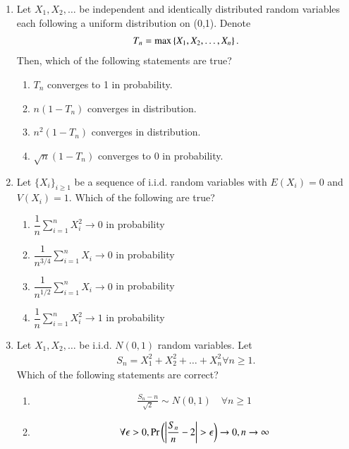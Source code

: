 \renewcommand{\theequation}{\theenumi}
\renewcommand{\thefigure}{\theenumi}
\renewcommand{\thetable}{\theenumi}
\begin{enumerate}[label=\thesection.\arabic*.,ref=\thesection.\theenumi]
%
\item 
Let $X_{1},X_{2},\dots$ be independent and identically distributed random variables each following a uniform distribution on (0,1). Denote 
\begin{align}
T_{n}=\max\left\{ X_{1},X_{2},\dots,X_{n}\right\}. 
\end{align}
Then, which of the following statements are true?
\begin{enumerate}
    \item $T_{n}$ converges to 1 in probability.
    \item $n(1-T_{n})$ converges in distribution.
    \item $n^{2}(1-T_{n})$ converges in distribution.
    \item $\sqrt{n}(1-T_{n})$ converges to 0 in probability.
\end{enumerate}
%
\solution

%
\item Let $\{X_i\}_{i \geq 1}$ be a sequence of i.i.d. random variables with $E(X_i)=0$ and $V(X_i)=1$. Which of the following are true?
%
\begin{enumerate}
    \setlength{\itemsep}{2pt}
    \item $\dfrac{1}{n} \sum_{i=1}^n X_i^2 \to 0$ in probability 
    \item $\dfrac{1}{n^{3/4}} \sum_{i=1}^n X_i \to 0$ in probability 
    \item $\dfrac{1}{n^{1/2}} \sum_{i=1}^n X_i \to 0$ in probability 
    \item $\dfrac{1}{n} \sum_{i=1}^n X_i^2 \to 1$ in probability
\end{enumerate}
%
\solution

%
\item Let $X_1,X_2, \dots$ be i.i.d. $N(0,1)$ random variables. Let 
\begin{align}
S_{n}=X_{1}^2+X_{2}^2+\dots+X_{n}^2 \forall n \geq 1. 
\end{align}
Which of the following statements are correct?
%
\begin{enumerate}
\setlength\itemsep{1em}
\item 
\begin{align}
    \frac{S_{n}-n}{\sqrt{2}}\sim N(0,1) \quad  \forall n\geq 1
\end{align}
\item 
\begin{align}
    \forall \epsilon > 0,\Pr\left(\left\vert\frac{S_n}{n}-2\right\vert>\epsilon\right)\to 0, n \to \infty
\end{align}


\end{enumerate}
\end{enumerate}
